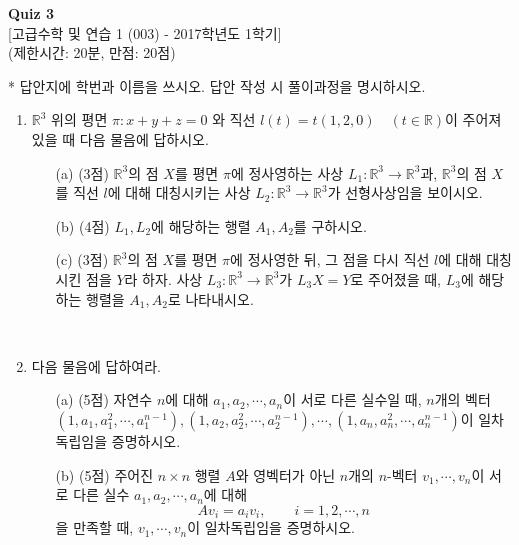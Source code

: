\documentclass{article}
\begin{document}
\begin{center}
\textbf{Quiz 3}\\
{[고급수학 및 연습 1 (003) - 2017학년도 1학기]}\\
(제한시간: 20분, 만점: 20점)\\
\end{center}

* 답안지에 학번과 이름을 쓰시오. 답안 작성 시 풀이과정을 명시하시오.

\begin{enumerate}
\item $\mathbb{R}^3$ 위의 평면 $\pi: x+y+z=0$ 와 직선 $l(t) = t(1, 2, 0) \quad (t\in\mathbb{R})$이 주어져 있을 때 다음 물음에 답하시오.
	\begin{enumerate}
		\item[(a)] (3점) $\mathbb{R}^3$의 점 $X$를 평면 $\pi$에 정사영하는 사상 $L_1: \mathbb{R}^3 \rightarrow \mathbb{R}^3$과, $\mathbb{R}^3$의 점 $X$를 직선 $l$에 대해 대칭시키는 사상 $L_2: \mathbb{R}^3 \rightarrow \mathbb{R}^3$가 선형사상임을 보이시오. \\
		\item[(b)] (4점) $L_1, L_2$에 해당하는 행렬 $A_1, A_2$를 구하시오. \\
		\item[(c)] (3점) $\mathbb{R}^3$의 점 $X$를 평면 $\pi$에 정사영한 뒤, 그 점을 다시 직선 $l$에 대해 대칭시킨 점을 $Y$라 하자. 사상 $L_3: \mathbb{R}^3 \rightarrow \mathbb{R}^3$가 $L_3 X = Y$로 주어졌을 때, $L_3$에 해당하는 행렬을 $A_1, A_2$로 나타내시오.
	\end{enumerate}
~
\item 다음 물음에 답하여라.
	\begin{enumerate}
		\item[(a)] (5점) 자연수 $n$에 대해 $a_1, a_2, \cdots, a_n$이 서로 다른 실수일 때, $n$개의 벡터 \\$(1, a_1, a_1^2, \cdots, a_1^{n-1}), (1, a_2, a_2^2, \cdots, a_2^{n-1}), \cdots, (1, a_n, a_n^2, \cdots, a_n^{n-1})$이 일차독립임을 증명하시오.\\
		\item[(b)] (5점) 주어진 $n\times n$ 행렬 $A$와 영벡터가 아닌 $n$개의 $n$-벡터 $v_1, \cdots, v_n$이 서로 다른 실수 $a_1, a_2, \cdots, a_n$에 대해
		$$Av_i = a_iv_i, \qquad i = 1, 2, \cdots, n$$ 을 만족할 때, $v_1, \cdots, v_n$이 일차독립임을 증명하시오.
	\end{enumerate}


\end{enumerate}
\end{document}
